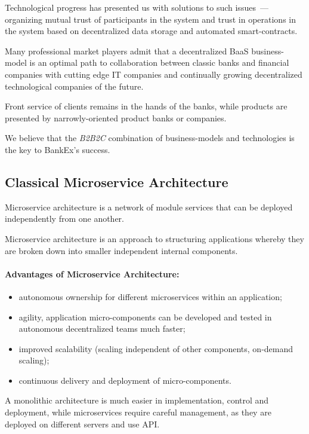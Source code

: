 \documentclass{article}
\begin{document}
\begin{multicols}{2}
Technological progress has presented us with solutions to such issues~--- organizing mutual trust of participants in the system and trust in operations in the system based on decentralized data storage and automated smart-contracts.

Many professional market players admit that a decentralized BaaS business-model is an optimal path to collaboration between classic banks and financial companies with cutting edge IT companies and continually growing decentralized technological companies of the future.

Front service of clients remains in the hands of the banks, while products are presented by narrowly-oriented product banks or companies. 

We believe that the \textit{B2B2C} combination of business-models and technologies is the key to BankEx’s success.

\subsection{Classical Microservice Architecture}

Microservice architecture is a network of module services that can be deployed independently from one another.

Microservice architecture is an approach to structuring applications whereby they are broken down into smaller independent internal components.

\paragraph{Advantages of Microservice Architecture:}

\begin{itemize}
\item autonomous ownership for different microservices within an application;
\item agility, application micro-components can be developed and tested in autonomous decentralized teams much faster;
\item improved scalability (scaling independent of other components, on-demand scaling);
\item continuous delivery and deployment of micro-components.
\end{itemize}

A monolithic architecture is much easier in implementation, control and deployment, while microservices require careful management, as they are deployed on different servers and use API.


\end{multicols}
\end{document}
